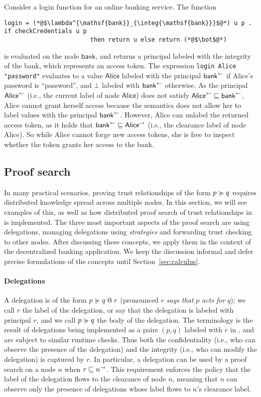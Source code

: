 Consider a login function for an online banking service. The function
\begin{lstlisting}
login = (*@$\lambda^{\mathsf{bank}}_{\integ{\mathsf{bank}}}$@*) u p . if checkCredentials u p
                        then return u else return (*@$\bot$@*)
\end{lstlisting}
is evaluated on the node $\mathsf{bank}$, and returns a principal labeled with the integrity of the bank, which represents an access token. The expression \lstinline[mathescape]!login Alice "password"! evaluates to a value $\mathsf{Alice}$ labeled with the principal $\integ{\mathsf{bank}}$ if Alice's password is ``password'', and $\bot$ labeled with $\integ{\mathsf{bank}}$ otherwise. As the principal $\integ{\mathsf{Alice}}$ (i.e., the current label of node $\mathsf{Alice}$) does not satisfy $\integ{\mathsf{Alice}} \flowsto \integ{\mathsf{bank}}$, Alice cannot grant herself access because the semantics does not allow her to label values with the principal $\integ{\mathsf{bank}}$.
However, Alice can unlabel the returned access token, as it holds that $\integ{\mathsf{bank}} \flowsto \conf{\mathsf{Alice}}$ (i.e., the clearance label of node Alice). So while Alice cannot forge new access tokens, she is free to inspect whether the token grants her access to the bank.

\subsection{Proof search}
In many practical scenarios, proving trust relationships of the form $p \actsfor q$ requires distributed knowledge spread across multiple nodes. In this section, we will see examples of this, as well as how distributed proof search of trust relationships in \lang{} is implemented. The three most important aspects of the proof search are using delegations, managing delegations using \emph{strategies} and forwarding trust checking to other nodes. After discussing these concepts, we apply them in the context of the decentralized banking application. We keep the discussion informal and defer precise formulations of the concepts until Section~\ref{sec:calculus}.

\paragraph{Delegations}
A delegation is of the form $\lb{r}{p \actsfor q}$ (pronounced $r$ \emph{says that} $p$ \emph{acts for} $q$); we call $r$ the label of the delegation, or say that the delegation is labeled with principal $r$, and we call $p \actsfor q$ the body of the delegation. The terminology is the result of delegations being implemented as a pairs $(p, q)$ labeled with $r$ in \lang, and are subject to similar runtime checks. Thus both the confidentiality (i.e., who can observe the presence of the delegation) and the integrity (i.e., who can modify the delegation) is captured by $r$. In particular, a delegation can be used by a proof search on a node $n$ when $r \flowsto \conf{n}$. This requirement enforces the policy that the label of the delegation flows to the clearance of node $n$, meaning that $n$ can observe only the presence of delegations whose label flows to $n$'s clearance label.


